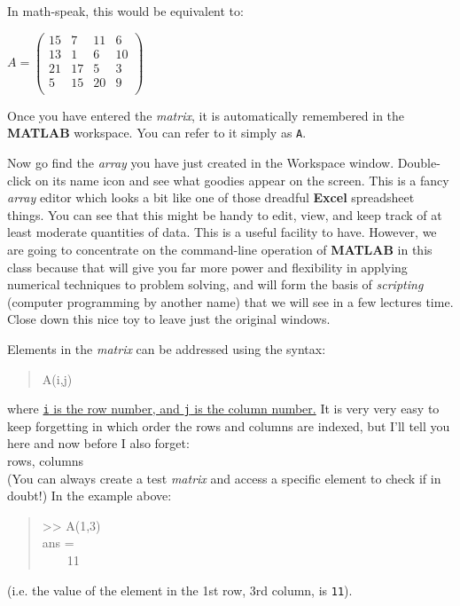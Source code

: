\documentclass{tufte-book} %
\newenvironment{docspec}{\begin{quotation}\ttfamily\parskip0pt\parindent0pt\ignorespaces}{\end{quotation}}
\begin{document}
In math-speak, this would be equivalent to:

\vspace{2mm}
\(A=\begin{pmatrix}15 & 7 & 11 & 6 \\
13 & 1 & 6 & 10 \\
21 & 17 & 5 & 3 \\
5 & 15 & 20 & 9 \\
\end{pmatrix}\)
\vspace{2mm}

\noindent Once you have entered the \textit{matrix}, it is automatically remembered in the \textbf{MATLAB} workspace. You can refer to it simply as \texttt{A}.

Now go find the \textit{array} you have just created in the \textsf{Workspace window}. Double-click on its name icon and see what goodies appear on the screen. This is a fancy \textit{array} editor which looks a bit like one of those dreadful \textbf{Excel} spreadsheet things. You can see that this might be handy to edit, view, and keep track of at least moderate quantities of data. This is a useful facility to have. However, we are going to concentrate on the command-line operation of \textbf{MATLAB} in this class because that will give you far more power and flexibility in applying numerical techniques to problem solving, and will form the basis of \textit{scripting} (computer programming by another name) that we will see in a few lectures time. Close down this nice toy to leave just the original windows.

Elements in the \textit{matrix} can be addressed using the syntax:
\begin{docspec}
A(i,j)
\end{docspec}
where \uline{\texttt{i} is the row number, and \texttt{j} is the column number.} It is very very easy to keep forgetting in which order the rows and columns are indexed, but I'll tell you here and now before I also forget:
\hfill \break
\\{\LARGE rows, columns}
\hfill \break
\\\noindent(You can always create a test \textit{matrix} and access a specific element to check if in doubt!)
In the example above:
\begin{docspec}
>> A(1,3)
\\ans =
\\ \ \ \ \ 11
\end{docspec}
\noindent (i.e. the value of the element in the 1st row, 3rd column, is \texttt{11}).
\end{document}
